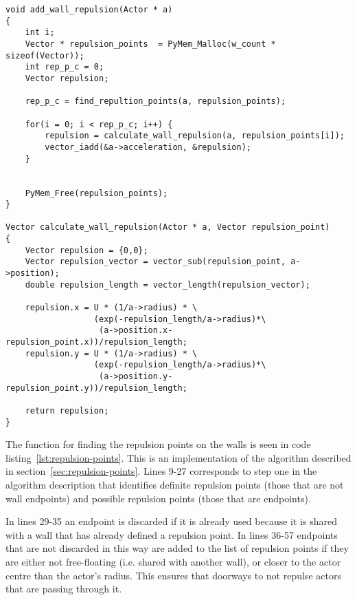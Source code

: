 \begin{lstlisting}[caption={Code to calculate the repulsion from the 
    walls.},label=lst:wall-repulsion]
void add_wall_repulsion(Actor * a)
{
    int i;
    Vector * repulsion_points  = PyMem_Malloc(w_count * sizeof(Vector));
    int rep_p_c = 0;
    Vector repulsion;

    rep_p_c = find_repultion_points(a, repulsion_points);

    for(i = 0; i < rep_p_c; i++) {
        repulsion = calculate_wall_repulsion(a, repulsion_points[i]);
        vector_iadd(&a->acceleration, &repulsion);
    }


    PyMem_Free(repulsion_points);
}

Vector calculate_wall_repulsion(Actor * a, Vector repulsion_point)
{
    Vector repulsion = {0,0};
    Vector repulsion_vector = vector_sub(repulsion_point, a->position);
    double repulsion_length = vector_length(repulsion_vector);

    repulsion.x = U * (1/a->radius) * \
                  (exp(-repulsion_length/a->radius)*\
                   (a->position.x-repulsion_point.x))/repulsion_length;
    repulsion.y = U * (1/a->radius) * \
                  (exp(-repulsion_length/a->radius)*\
                   (a->position.y-repulsion_point.y))/repulsion_length;

    return repulsion;
}
\end{lstlisting}

The function for finding the repulsion points on the walls is seen in code 
listing~\ref{lst:repulsion-points}. This is an implementation of the algorithm 
described in section~\ref{sec:repulsion-points}. Lines 9-27 corresponds to 
step one in the algorithm description that identifies definite repulsion 
points (those that are not wall endpoints) and possible repulsion points 
(those that are endpoints).

In lines 29-35 an endpoint is discarded if it is already used because it is 
shared with a wall that has already defined a repulsion point. In lines 36-57 
endpoints that are not discarded in this way are added to the list of 
repulsion points if they are either not free-floating (i.e. shared with 
another wall), or closer to the actor centre than the actor's radius. This 
ensures that doorways to not repulse actors that are passing through it.

